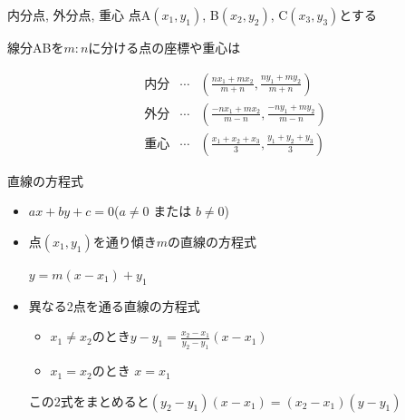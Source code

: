\documentclass[aspectratio=169, 12pt]{beamer} %
\begin{document}
\begin{frame}{内分点, 外分点, 重心}
    点A$(x_1,y_1)$, B$(x_2, y_2)$, C$(x_3,y_3)$とする \par
    線分ABを$m:n$に分ける点の座標や重心は\par
    \begin{eqnarray*}
        \text{内分}&\cdots& \left(\frac{nx_1+mx_2}{m+n},\frac{ny_1+my_2}{m+n}\right) \\
        \text{外分}&\cdots& \left(\frac{-nx_1+mx_2}{m-n}, \frac{-ny_1+my_2}{m-n}\right) \\
        \text{重心}&\cdots& \left(\frac{x_1+x_2+x_3}{3},\frac{y_1+y_2+y_3}{3}\right)
    \end{eqnarray*}
\end{frame}
\begin{frame}{直線の方程式}
    \begin{itemize}
        \item $ax+by+c=0$\space ($a\neq0$ または $b\neq0$)
        \item 点$(x_1, y_1)$を通り傾き$m$の直線の方程式\par
              $y=m(x-x_1)+y_1$
        \item 異なる2点を通る直線の方程式
              \begin{itemize}
                  \item $x_1\neq x_2$のとき$y-y_1=\frac{x_2-x_1}{y_2-y_1}(x-x_1)$ \par
                  \item $x_1=x_2$のとき $x=x_1$
              \end{itemize}
              この2式をまとめると$(y_2-y_1)(x-x_1)=(x_2-x_1)(y-y_1)$
    \end{itemize}
\end{frame}
\end{document}
